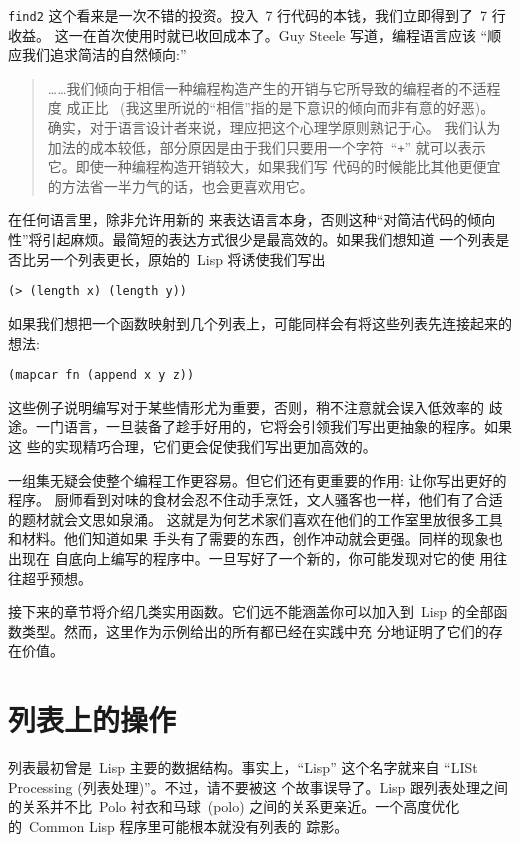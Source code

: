 \texttt{find2} 这个\utility{}看来是一次不错的投资。投入~7 行代码的本钱，我们立即得到了~7 行收益。
这一\utility{}在首次使用时就已收回成本了。Guy Steele 写道，编程语言应该
``顺应我们追求简洁的自然倾向:''
\label{guy_steele_rule}
\begin{quote}
  ……我们倾向于相信一种编程构造产生的开销与它所导致的编程者的不适程度
  成正比
  ~(我这里所说的``相信''指的是下意识的倾向而非有意的好恶)。
  确实，对于语言设计者来说，理应把这个心理学原则熟记于心。
  我们认为加法的成本较低，部分原因是由于我们只要用一个字符~``\texttt{+}''
  就可以表示它。即使一种编程构造开销较大，如果我们写
  代码的时候能比其他更便宜的方法省一半力气的话，也会更喜欢用它。
\end{quote}
在任何语言里，除非允许用新的
\utility{}来表达语言本身，否则这种``对简洁代码的倾向性''将引起麻烦。最简短的表达方式很少是最高效的。如果我们想知道
一个列表是否比另一个列表更长，原始的~Lisp 将诱使我们写出
\begin{lstlisting}
(> (length x) (length y))
\end{lstlisting}
如果我们想把一个函数映射到几个列表上，可能同样会有将这些列表先连接起来的想法:
\begin{lstlisting}
(mapcar fn (append x y z))
\end{lstlisting}
这些例子说明编写\utility{}对于某些情形尤为重要，否则，稍不注意就会误入低效率的
歧途。一门语言，一旦装备了趁手好用的\utility{}，它将会引领我们写出更抽象的程序。如果这
些\utility{}的实现精巧合理，它们更会促使我们写出更加高效的\utility{}。

一组\utility{}集无疑会使整个编程工作更容易。但它们还有更重要的作用:
让你写出更好的程序。
厨师看到对味的食材会忍不住动手烹饪，文人骚客也一样，他们有了合适的题材就会文思如泉涌。
这就是为何艺术家们喜欢在他们的工作室里放很多工具和材料。他们知道如果
手头有了需要的东西，创作冲动就会更强。同样的现象也出现在
自底向上编写的程序中。一旦写好了一个新的\utility{}，你可能发现对它的使
用往往超乎预想。

接下来的章节将介绍几类实用函数。它们远不能涵盖你可以加入到~Lisp
的全部函数类型。然而，这里作为示例给出的所有\utility{}都已经在实践中充
分地证明了它们的存在价值。

\section{列表上的操作}
\label{sec:operations_on_lists}

列表最初曾是~Lisp 主要的数据结构。事实上，``Lisp'' 这个名字就来自
``LISt Processing (列表处理)''。不过，请不要被这
个故事误导了。Lisp 跟列表处理之间的关系并不比~Polo 衬衣和马球~(polo) 
之间的关系更亲近。一个高度优化的~Common Lisp 程序里可能根本就没有列表的
踪影。

